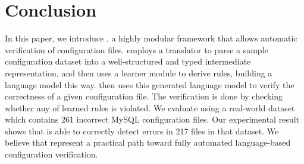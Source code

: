
\section{Conclusion}

In this paper, we introduce \app, a highly modular framework 
that allows automatic verification of configuration files.
\app employs a translator to parse a sample configuration dataset
into a well-structured and typed intermediate representation,
and then uses a learner module to derive rules, 
building a language model this way.
\app then uses this generated language model 
to verify the correctness of
a given configuration file. The verification is done by
checking whether any of learned rules is violated.
We evaluate \app using a real-world dataset~\cite{configdataset}
which contains 261 incorrect MySQL configuration files.
Our experimental result shows that \app is able to
correctly detect errors in 217 files in that dataset.
 We believe that \app represent a practical path
toward fully automated language-based configuration verification.

